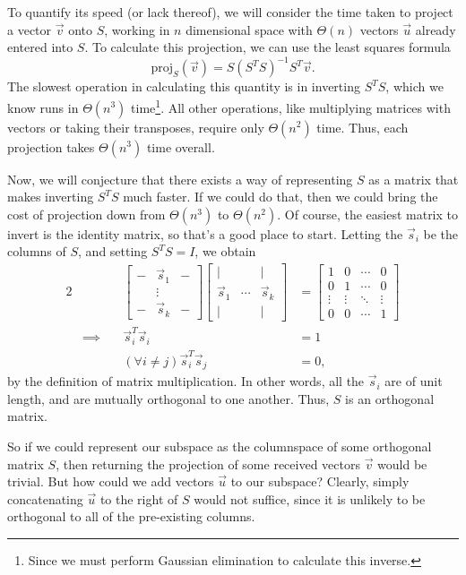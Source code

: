 \documentclass[letterpaper]{article}
\theoremstyle{remark}
\newcommand{\mat}[1]{\ensuremath{\begin{bmatrix}#1\end{bmatrix}}}
\newcommand{\eqn}[1]{\begin{alignat*}{2}#1\end{alignat*}}
\newcommand*{\thus}{&\implies\quad&}
\begin{document}
To quantify its speed (or lack thereof), we will consider the time taken to project a vector $\vec{v}$ onto $S$, working in $n$ dimensional space with $\Theta(n)$ vectors $\vec{u}$ already entered into $S$. To calculate this projection, we can use the least squares formula
\[
    \text{proj}_S(\vec{v}) = S(S^TS)^{-1}S^T\vec{v}.
\]
The slowest operation in calculating this quantity is in inverting $S^TS$, which we know runs in $\Theta(n^3)$ time\footnote{Since we must perform Gaussian elimination to calculate this inverse.}. All other operations, like multiplying matrices with vectors or taking their transposes, require only $\Theta(n^2)$ time. Thus, each projection takes $\Theta(n^3)$ time overall.

Now, we will conjecture that there exists a way of representing $S$ as a matrix that makes inverting $S^TS$ much faster. If we could do that, then we could bring the cost of projection down from $\Theta(n^3)$ to $\Theta(n^2)$. Of course, the easiest matrix to invert is the identity matrix, so that's a good place to start. Letting the $\vec{s}_i$ be the columns of $S$, and setting $S^TS = I$, we obtain
\eqn{
    && \mat{- & \vec{s}_1 & - \\ & \vdots &  \\ - & \vec{s}_k & -} \mat{| & & | \\ \vec{s}_1 & \cdots & \vec{s}_k \\ | & & |} &= \mat{1 & 0 & \cdots & 0 \\ 0 & 1 & \cdots & 0 \\
    \vdots & \vdots & \ddots & \vdots \\
    0 & 0 & \cdots & 1} \\
    \thus \vec{s}_i^T\vec{s}_i &= 1 \\
    && (\forall i \ne j)\vec{s}_i^T\vec{s}_j &= 0,
}
by the definition of matrix multiplication. In other words, all the $\vec{s}_i$ are of unit length, and are mutually orthogonal to one another. Thus, $S$ is an orthogonal matrix.

So if we could represent our subspace as the columnspace of some orthogonal matrix $S$, then returning the projection of some received vectors $\vec{v}$ would be trivial. But how could we add vectors $\vec{u}$ to our subspace? Clearly, simply concatenating $\vec{u}$ to the right of $S$ would not suffice, since it is unlikely to be orthogonal to all of the pre-existing columns.
\end{document}
